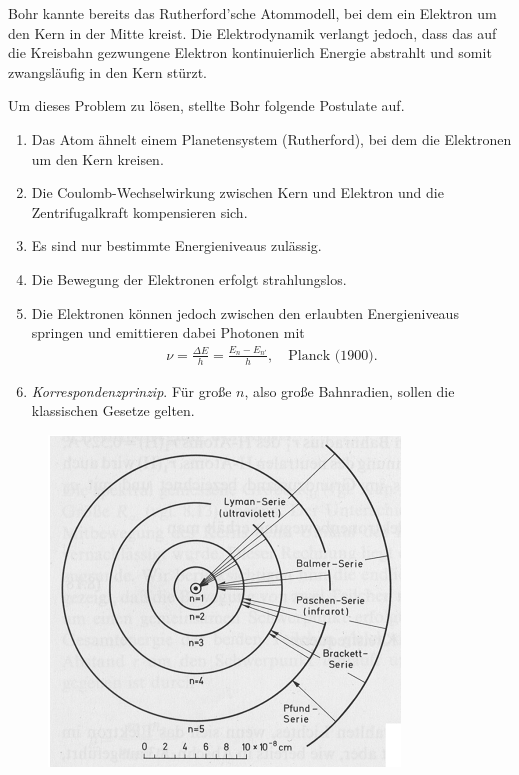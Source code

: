 Bohr kannte bereits das Rutherford'sche Atommodell, bei dem ein Elektron um den
Kern in der Mitte kreist. Die Elektrodynamik verlangt jedoch, dass das auf die
Kreisbahn gezwungene Elektron kontinuierlich Energie abstrahlt und somit
zwangsläufig in den Kern stürzt.

Um dieses Problem zu lösen, stellte Bohr folgende Postulate auf.
\begin{enumerate}[label=\arabic{*})]
  \item Das Atom ähnelt einem Planetensystem (Rutherford), bei dem die
  Elektronen um den Kern kreisen.
  \item Die Coulomb-Wechselwirkung zwischen Kern und Elektron und die 
  Zentrifugalkraft kompensieren sich.
  \item Es sind nur bestimmte Energieniveaus zulässig.
  \item Die Bewegung der Elektronen erfolgt strahlungslos.
  \item Die Elektronen können jedoch zwischen den erlaubten Energieniveaus
  springen und emittieren dabei Photonen mit
\begin{align*}
\nu = \frac{\Delta E}{h} = \frac{E_n-E_{n'}}{h},\quad \text{Planck (1900)}.
\end{align*}
\item \textit{Korrespondenzprinzip}. Für große $n$, also große Bahnradien,
sollen die klassischen Gesetze gelten.
\end{enumerate}

\begin{figure}[!htbp]
	\centering
	\includegraphics[width=\textwidth]{fig/3-BohrscherWasserstoff.png}
\end{figure}


